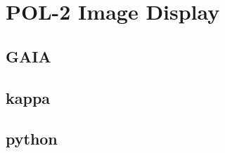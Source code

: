\chapter{POL-2 Image Display}
\label{sec:display}

\section{GAIA}


\section{kappa}


\section{python}

